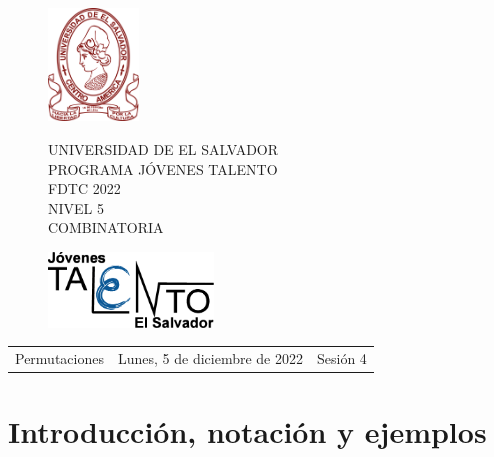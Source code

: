 \documentclass[12pt]{article}
\newcommand{\tema}{Permutaciones}
\newcommand{\fecha}{Lunes, 5 de diciembre de 2022}
\newcommand{\sesion}{Sesión 4}
\begin{document}
\thispagestyle{empty}

\begin{figure}[h] 
	\begin{minipage}[b]{0.26\textwidth}
		\begin{center}
			\includegraphics[height=3cm]{Logos/UES.png}
			\par\end{center}
	\end{minipage} 
	\begin{minipage}[b]{0.46\textwidth}
		\begin{center}
			UNIVERSIDAD DE EL SALVADOR\\ [0.1cm]
			PROGRAMA JÓVENES TALENTO\\ [0.1cm]
	        FDTC 2022\\ [0.1cm]
                NIVEL 5\\ [0.1cm]
			COMBINATORIA 
			\par\end{center}
	\end{minipage} 
	\begin{minipage}[b]{0.05\textwidth}
		\begin{center}
			\includegraphics[height=2cm]{Logos/LOGO PJT.png}
			\par\end{center}
	\end{minipage}
\end{figure}

\begin{center}
    \begin{tabular}{p{4.5cm} p{7cm} p{4.5cm}}
        \tema & \centering\fecha & \hfill\sesion
    \end{tabular}
\end{center}
\section{Introducción, notación y ejemplos}
\end{document}
